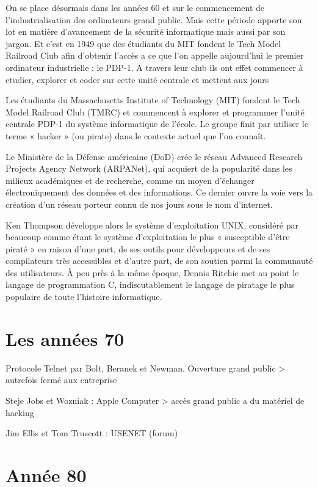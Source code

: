 \documentclass[a4paper]{memoir}
\begin{document}
On se place désormais dans les années 60 et sur le commencement de l'industrialisation des ordinateurs grand public. Mais cette période apporte son lot en matière d'avancement de la sécurité informatique mais aussi par son jargon. Et c'est en 1949 que des étudiants du MIT fondent le Tech Model Railroad Club afin d'obtenir l'accès a ce que l'on appelle aujourd'hui le premier ordinateur industrielle : le PDP-1. A travers leur club ils ont effet commencer à etudier, explorer et coder sur cette unité centrale et mettent aux jours 

    Les étudiants du Massachusetts Institute of Technology (MIT) fondent le Tech Model Railroad Club (TMRC) et commencent à explorer et programmer l'unité centrale PDP-1 du système informatique de l'école. Le groupe finit par utiliser le terme « hacker » (ou pirate) dans le contexte actuel que l'on connaît.

    Le Ministère de la Défense américaine (DoD) crée le réseau Advanced Research Projects Agency Network (ARPANet), qui acquiert de la popularité dans les milieux académiques et de recherche, comme un moyen d'échanger électroniquement des données et des informations. Ce dernier ouvre la voie vers la création d'un réseau porteur connu de nos jours sous le nom d'internet.

    Ken Thompson développe alors le système d'exploitation UNIX, considéré par beaucoup comme étant le système d'exploitation le plus « susceptible d'être piraté » en raison d'une part, de ses outils pour développeurs et de ses compilateurs très accessibles et d'autre part, de son soutien parmi la communauté des utilisateurs. À peu près à la même époque, Dennis Ritchie met au point le langage de programmation C, indiscutablement le langage de piratage le plus populaire de toute l'histoire informatique.

\section{Les années 70}

Protocole Telnet par Bolt, Beranek et Newman.
Ouverture grand public > autrefois fermé aux entreprise

Steje Jobs et Wozniak : Apple Computer > accès grand public a du matériel de hacking

Jim Ellis et Tom Truscott : USENET (forum)

\section{Année 80}
\end{document}
